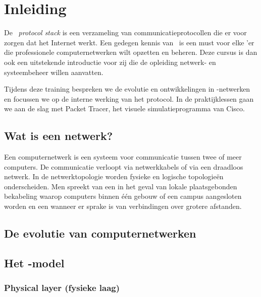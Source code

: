 \chapter{Inleiding}
\label{chap:inleiding}

De \TCPIP\ \emph{protocol stack} is een verzameling van communicatieprotocollen die er voor zorgen dat het Internet werkt.
Een gedegen kennis van \TCPIP\ is een must voor elke 'er die professionele computernetwerken wilt opzetten en beheren.
Deze cursus is dan ook een uitstekende introductie voor zij die de opleiding netwerk- en systeembeheer willen aanvatten.

Tijdens%
deze training bespreken we de evolutie en ontwikkelingen in \TCPIP-netwerken en focussen we op de interne werking van het protocol.
In de praktijklessen gaan we aan de slag met Packet Tracer,
het visuele simulatieprogramma van Cisco.

\section{Wat is een netwerk?}

Een computernetwerk is een systeem voor communicatie tussen twee of meer computers.
De communicatie verloopt via netwerkkabels of via een draadloos netwerk.
In de netwerktopologie worden fysieke en logische topologieën onderscheiden.
Men spreekt van een  in het geval van lokale plaatsgebonden bekabeling waarop computers binnen één gebouw of een campus aangesloten worden en een  wanneer er sprake is van verbindingen over grotere afstanden.



\section{De evolutie van computernetwerken}









\section{Het -model}


\subsection{Physical layer (fysieke laag)}

